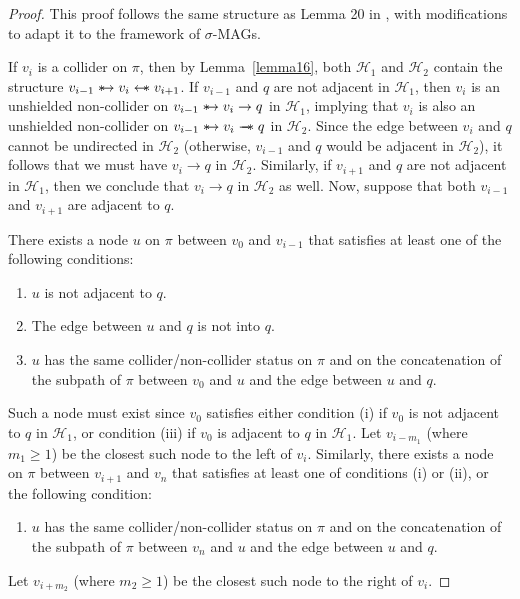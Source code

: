 \documentclass[accepted]{uai2025} %
\newcommand{\hus}{\mathrel{{\leftarrow\mkern-11mu\ast}}}
\newcommand{\suh}{\mathrel{{\ast\mkern-11mu\to}}}
\newcommand{\tus}{\mathrel{{\relbar\mkern-11mu\relbar\mkern-11mu\ast}}}
\begin{document}
{\renewcommand\footnote[1]{}\lemmatwenty*}
\begin{proof}
This proof follows the same structure as Lemma 20 in \citep{spirtes1996polynomial}, with modifications to adapt it to the framework of \( \sigma \)-MAGs.

If \( v_i \) is a collider on \( \pi \), then by Lemma~\ref{lemma16}, both \( \mathcal{H}_1 \) and \( \mathcal{H}_2 \) contain the structure \( v_{i-1} \suh v_i \hus  v_{i+1} \). If \( v_{i-1} \) and \( q \) are not adjacent in \( \mathcal{H}_1 \), then \( v_i \) is an unshielded non-collider on \( v_{i-1} \suh v_i \rightarrow q \) in \( \mathcal{H}_1 \), implying that \( v_i \) is also an unshielded non-collider on \( v_{i-1} \suh v_i \tus  q \) in \( \mathcal{H}_2 \). Since the edge between \( v_i \) and \( q \) cannot be undirected in \( \mathcal{H}_2 \) (otherwise, \( v_{i-1} \) and \( q \) would be adjacent in \( \mathcal{H}_2 \)), it follows that we must have \( v_i \rightarrow q \) in \( \mathcal{H}_2 \). Similarly, if \( v_{i+1} \) and \( q \) are not adjacent in \( \mathcal{H}_1 \), then we conclude that \( v_i \rightarrow q \) in \( \mathcal{H}_2 \) as well. Now, suppose that both \( v_{i-1} \) and \( v_{i+1} \) are adjacent to \( q \).  

There exists a node \( u \) on \( \pi \) between \( v_0 \) and \( v_{i-1} \) that satisfies at least one of the following conditions:  
\begin{enumerate}  
    \item[(i)] \( u \) is not adjacent to \( q \).  
    \item[(ii)] The edge between \( u \) and \( q \) is not into \( q \).  
    \item[(iii)] \( u \) has the same collider/non-collider status on \( \pi \) and on the concatenation of the subpath of \( \pi \) between \( v_0 \) and \( u \) and the edge between \( u \) and \( q \).  
\end{enumerate}  
Such a node must exist since \( v_0 \) satisfies either condition (i) if \( v_0 \) is not adjacent to \( q \) in \( \mathcal{H}_1 \), or condition (iii) if \( v_0 \) is adjacent to \( q \) in \( \mathcal{H}_1 \). Let \( v_{i-m_1} \) (where \( m_1 \geq 1 \)) be the closest such node to the left of \( v_i \). Similarly, there exists a node on \( \pi \) between \( v_{i+1} \) and \( v_n \) that satisfies at least one of conditions (i) or (ii), or the following condition:  
\begin{enumerate}  
    \item[(iii')] \( u \) has the same collider/non-collider status on \( \pi \) and on the concatenation of the subpath of \( \pi \) between \( v_n \) and \( u \) and the edge between \( u \) and \( q \).  
\end{enumerate}  
Let \( v_{i+m_2} \) (where \( m_2 \geq 1 \)) be the closest such node to the right of \( v_i \).  


\end{proof}
\end{document}
